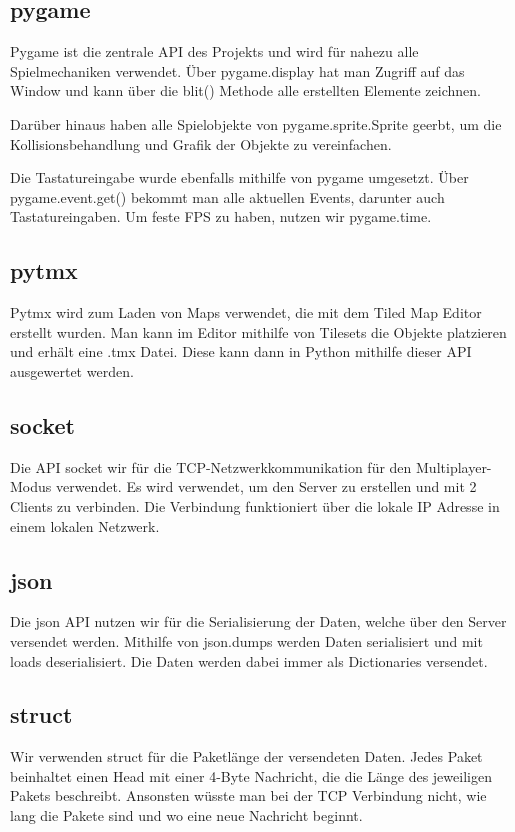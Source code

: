 \documentclass[12pt, a4paper, twoside]{article}
\begin{document}
\subsection{pygame}

Pygame ist die zentrale API des Projekts und wird für nahezu alle Spielmechaniken verwendet.
Über pygame.display hat man Zugriff auf das Window und kann über die blit() Methode
alle erstellten Elemente zeichnen.

Darüber hinaus haben alle Spielobjekte von pygame.sprite.Sprite geerbt, um die Kollisionsbehandlung
und Grafik der Objekte zu vereinfachen.

Die Tastatureingabe wurde ebenfalls mithilfe von pygame umgesetzt. Über pygame.event.get() bekommt 
man alle aktuellen Events, darunter auch Tastatureingaben. 
Um feste FPS zu haben, nutzen wir pygame.time.

\subsection{pytmx}
Pytmx wird zum Laden von Maps verwendet, die mit dem Tiled Map Editor erstellt wurden.
Man kann im Editor mithilfe von Tilesets die Objekte platzieren und erhält eine .tmx Datei.
Diese kann dann in Python mithilfe dieser API ausgewertet werden.

\subsection{socket}
Die API socket wir für die TCP-Netzwerkkommunikation für den Multiplayer-Modus verwendet.
Es wird verwendet, um den Server zu erstellen und mit 2 Clients zu verbinden. Die Verbindung
funktioniert über die lokale IP Adresse in einem lokalen Netzwerk.


\subsection{json}
Die json API nutzen wir für die Serialisierung der Daten, welche über den Server versendet werden.
Mithilfe von json.dumps werden Daten serialisiert und mit loads deserialisiert.
Die Daten werden dabei immer als Dictionaries versendet.

\subsection{struct}
Wir verwenden struct für die Paketlänge der versendeten Daten.
Jedes Paket beinhaltet einen Head mit einer 4-Byte Nachricht, die die Länge des jeweiligen
Pakets beschreibt. Ansonsten wüsste man bei der TCP Verbindung nicht, wie lang die Pakete sind
und wo eine neue Nachricht beginnt.
\end{document}
